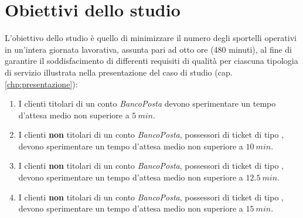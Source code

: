 \chapter{Obiettivi dello studio}\label{chp:obiettivi}
L'obiettivo dello studio è quello di minimizzare il numero degli sportelli operativi in un'intera giornata lavorativa, assunta pari ad otto ore (480 minuti), al fine di garantire il soddisfacimento di differenti requisiti di qualità per ciascuna tipologia di servizio illustrata nella presentazione del caso di studio (cap. \ref{chp:presentazione}):

\begin{enumerate}[label=QoS-\arabic*), align=left, leftmargin=*]
\item I clienti titolari di un conto \textsl{BancoPosta} devono sperimentare un tempo d'attesa medio non superiore a $5\ min$.
\item I clienti \textbf{non} titolari di un conto \textsl{BancoPosta}, possessori di ticket di tipo \uo{}, devono sperimentare un tempo d'attesa medio non superiore a $10\ min$.
\item I clienti \textbf{non} titolari di un conto \textsl{BancoPosta}, possessori di ticket di tipo \pp{}, devono sperimentare un tempo d'attesa medio non superiore a $12.5\ min$.
\item I clienti \textbf{non} titolari di un conto \textsl{BancoPosta}, possessori di ticket di tipo \sr{}, devono sperimentare un tempo d'attesa medio non superiore a $15\ min$.
\end{enumerate}